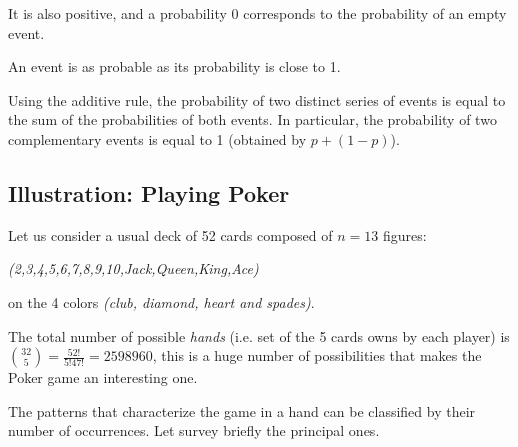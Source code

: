 It is also positive, and a probability $0$ corresponds to the probability of an empty event.

An event is as probable as its probability is close to 1.

Using the additive rule, the probability of two distinct series of events is equal to the sum of the probabilities
of both events. 
In particular, the probability of two complementary events is equal to 1 (obtained by $p + (1-p)$).


\subsection{Illustration: Playing Poker}

Let us consider a usual deck of 52 cards composed of $n=13$ figures:

\textit{(2,3,4,5,6,7,8,9,10,Jack,Queen,King,Ace)} 

on the 4 colors \textit{(club, diamond, heart and spades)}.

The total number of possible \textit{hands} (i.e. set of the 5 cards owns by each player) is 
${32 \choose 5} = \frac{52!}{5! 47!} = 2 598 960$, this is a huge number of possibilities that makes the Poker game an interesting one.

The patterns that characterize the game in a hand can be classified by their number of occurrences.
Let survey briefly the principal ones.

